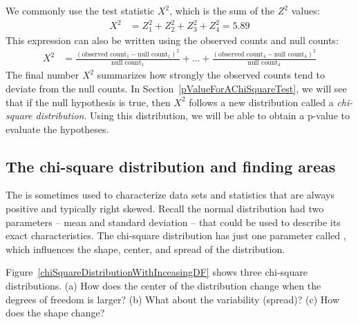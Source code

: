 We commonly use the test statistic $X^2$, which is the sum of the $Z^2$ values:
\begin{align*}
X^2 &= Z_1^2 + Z_2^2 + Z_3^2 + Z_4^2 = 5.89
\end{align*}
This expression can also be written using the observed counts and null counts:
{\footnotesize\begin{align*}
X^2 &= \frac{(\text{observed count}_1 - \text{null count}_1)^2}{\text{null count}_1} + \dots + \frac{(\text{observed count}_4 - \text{null count}_4)^2}{\text{null count}_4}
\end{align*}
}The final number $X^2$ summarizes how strongly the observed counts tend to deviate from the null counts. In Section~\ref{pValueForAChiSquareTest}, we will see that if the null hypothesis is true, then $X^2$ follows a new distribution called a \emph{chi-square distribution}. Using this distribution, we will be able to obtain a p-value to evaluate the hypotheses.

\subsection{The chi-square distribution and finding areas}

The  is sometimes used to characterize data sets and statistics that are always positive and typically right skewed. Recall the normal distribution had two parameters -- mean and standard deviation -- that could be used to describe its exact characteristics. The chi-square distribution has just one parameter called , which influences the shape, center, and spread of the distribution.

\begin{exercise}\label{exerChiSquareDistributionDescriptionWithMoreDOF}
Figure~\ref{chiSquareDistributionWithInceasingDF} shows three chi-square distributions. (a) How does the center of the distribution change when the degrees of freedom is larger? (b) What about the variability (spread)? (c) How does the shape change?
\end{exercise}


